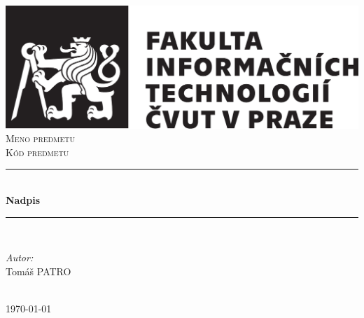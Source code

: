 \documentclass[11pt,a4,twoside]{article}
\begin{document}
\begin{titlepage}

\newcommand{\HRule}{\rule{\linewidth}{0.1mm}}

\center
 

\includegraphics[scale=.8]{graphics/cvut-logo-bw.pdf}\\[2cm]
\textsc{\Large Meno predmetu}\\[0.5cm]
\textsc{\large Kód predmetu}\\[0.5cm]


\HRule \\[0.4cm]
{ \huge \bfseries Nadpis}\\[0.4cm]
\HRule \\[1.5cm]
 

\begin{minipage}{0.4\textwidth}
\begin{flushleft} \large
\emph{Autor:}\\
Tomáš \textsc{PATRO}\\
\end{flushleft}

\end{minipage}\\[2cm]


{\large \today}\\[2cm]

\vfill

\end{titlepage}

\newpage
\printbibliography
\end{document}

